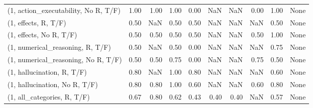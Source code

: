 \begin{table*}[h!]
\begin{adjustbox}{width=2\columnwidth,center}
\begin{tabular}{lrrr|rrr|rrr}
(1, action\_executability, No R, T/F) &                      1.00 &                  1.00 &                      1.00 &                          0.00 &                       NaN &                           NaN &                                   0.00 &                               1.00 &                                  None \\
(1, effects, R, T/F)                 &                      0.50 &                   NaN &                      0.50 &                          0.50 &                       NaN &                           NaN &                                    NaN &                               0.50 &                                  None \\
(1, effects, No R, T/F)              &                      0.50 &                  0.50 &                      0.50 &                          0.50 &                       NaN &                           NaN &                                   0.50 &                               1.00 &                                  None \\
(1, numerical\_reasoning, R, T/F)     &                      0.50 &                   NaN &                      0.50 &                          0.00 &                       NaN &                           NaN &                                    NaN &                               0.75 &                                  None \\
(1, numerical\_reasoning, No R, T/F)  &                      0.50 &                  0.50 &                      0.75 &                          0.00 &                       NaN &                           NaN &                                   0.75 &                               0.50 &                                  None \\
(1, hallucination, R, T/F)           &                      0.80 &                   NaN &                      1.00 &                          0.80 &                       NaN &                           NaN &                                    NaN &                               0.60 &                                  None \\
(1, hallucination, No R, T/F)        &                      0.80 &                  0.80 &                      1.00 &                          0.60 &                       NaN &                           NaN &                                   0.60 &                               0.80 &                                  None \\
(1, all\_categories, R, T/F)          &                      0.67 &                  0.80 &                      0.62 &                          0.43 &                      0.40 &                          0.40 &                                    NaN &                               0.57 &                                  None \\

\end{tabular}
\end{adjustbox}
\end{table*}
